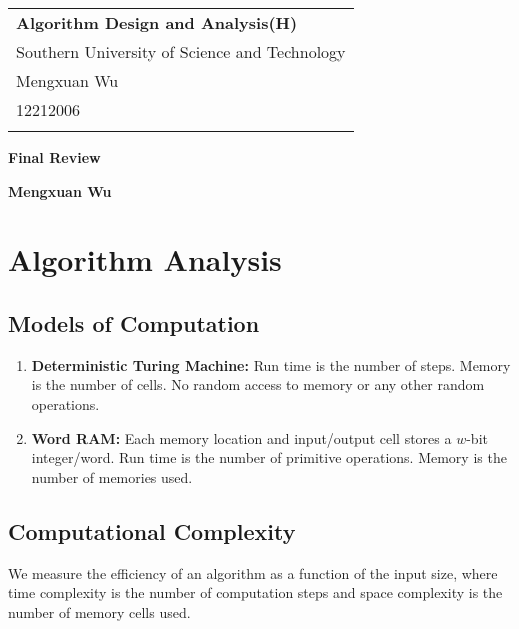 \documentclass[a4paper,12pt]{article}
\begin{document}
\thispagestyle{empty} %

\begin{tabular}{p{15.5cm}}
{\large \bf Algorithm Design and Analysis(H)} \\
Southern University of Science and Technology \\ Mengxuan Wu \\ 12212006 \\
\hline
\\
\end{tabular}

\vspace*{0.3cm} %

\begin{center}
	{\Large \bf Final Review}
	\vspace{2mm}

	{\bf Mengxuan Wu}
		
\end{center}  

\vspace*{0.4cm} 

\section{Algorithm Analysis}

\subsection{Models of Computation}

\begin{enumerate}
	\item \textbf{Deterministic Turing Machine:} Run time is the number of steps. Memory is the number of cells. No random access to memory or any other random operations.
	\item \textbf{Word RAM:} Each memory location and input/output cell stores a $w$-bit integer/word. Run time is the number of primitive operations. Memory is the number of memories used.
\end{enumerate}

\subsection{Computational Complexity}

We measure the efficiency of an algorithm as a function of the input size, where time complexity is the number of computation steps and space complexity is the number of memory cells used.
\end{document}
